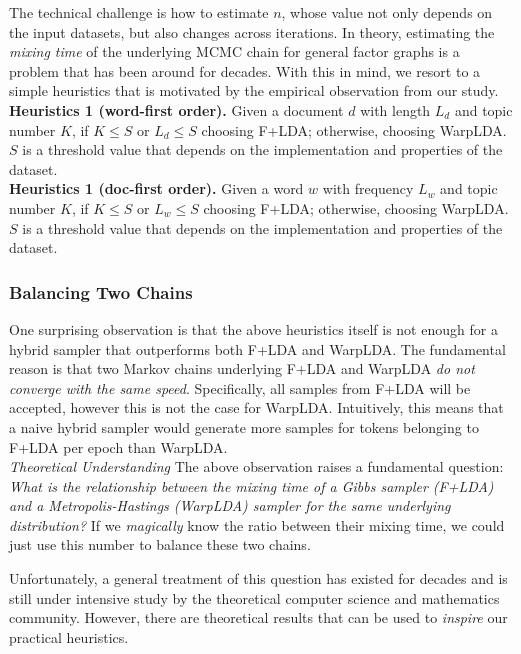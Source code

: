 \documentclass[10pt,journal,cspaper,compsoc]{IEEEtran}
\begin{document}
	The technical challenge is how to estimate $n$, whose value not only
	depends on the input datasets, but also changes across iterations. In theory,
	estimating the {\em mixing time} of
	the underlying MCMC chain for general factor graphs is a problem
	that has been around for decades. With this in mind, we resort to
	a simple heuristics that is motivated by the empirical
	observation from our study.\\
	

	\noindent
	\textbf{Heuristics 1 (word-first order).} Given a document $d$ with length $L_d$ and topic number $K$, if $K \le S$ or $L_d \le S$ choosing F+LDA;
	otherwise, choosing WarpLDA.
	$S$ is a threshold value that depends on the implementation and properties of the dataset.
	\\
	
	\noindent
	\textbf{Heuristics 1 (doc-first order).} Given a word $w$ with frequency $L_w$ and topic number $K$, if $K \le S$ or $L_w \le S$ choosing F+LDA;
	otherwise, choosing WarpLDA.
	$S$ is a threshold value that depends on the implementation and properties of the dataset.
	
	\subsubsection{Balancing Two Chains}
	
	One surprising observation is that the above heuristics itself is not
	enough for a hybrid sampler that outperforms both F+LDA and WarpLDA.
	The fundamental reason is that two Markov chains underlying F+LDA and WarpLDA
	{\em do not converge with the same speed}.
	Specifically, all samples from F+LDA will be accepted, however this is not the case for WarpLDA.
	Intuitively, this means that a naive hybrid sampler would generate more samples
	for tokens belonging to F+LDA per epoch than WarpLDA.
	\\
	

    \noindent
	{\large \em Theoretical Understanding} The above observation raises a fundamental
	question: {\em What is the relationship between the mixing time of a
		Gibbs sampler (F+LDA) and a Metropolis-Hastings (WarpLDA) sampler for the
		same underlying distribution?} If we {\em magically} know the ratio
	between their mixing time, we could just use this number to balance these
	two chains.
	
	Unfortunately, a general treatment of this question has existed for
	decades and is still under intensive study by the theoretical computer
	science and mathematics community. However, there are theoretical
	results that can be used to {\em inspire} our practical heuristics.
	
\end{document}
